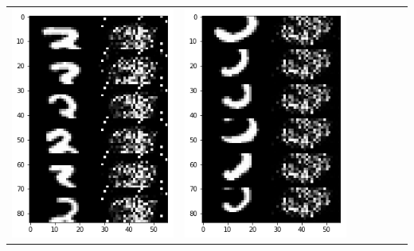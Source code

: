 \documentclass[12pt]{report} %
\begin{document}
\begin{tabular}{m{0.7cm}m{2.4cm}m{2.4cm}m{2.4cm}m{2.4cm}m{2.4cm}m{2.4cm}}
\includegraphics[scale=0.3]{pictures/M2_3_up.png} & \includegraphics[scale=0.3]{pictures/M2_3_down.png}\\

\end{tabular}
\end{document}
